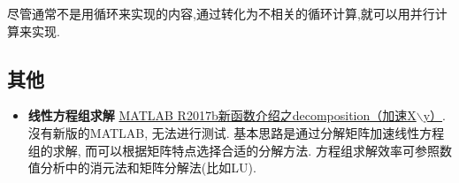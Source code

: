 尽管通常不是用循环来实现的内容,通过转化为不相关的循环计算,就可以用并行计算来实现.






\subsection{其他}

\begin{itemize}
    \item \textbf{线性方程组求解} \href{https://zhuanlan.zhihu.com/p/30958676}{MATLAB R2017b新函数介绍之decomposition（加速X$\backslash$y）}. 沒有新版的MATLAB, 无法进行测试. 基本思路是通过分解矩阵加速线性方程组的求解, 而可以根据矩阵特点选择合适的分解方法. 方程组求解效率可参照数值分析中的消元法和矩阵分解法(比如LU).
\end{itemize}